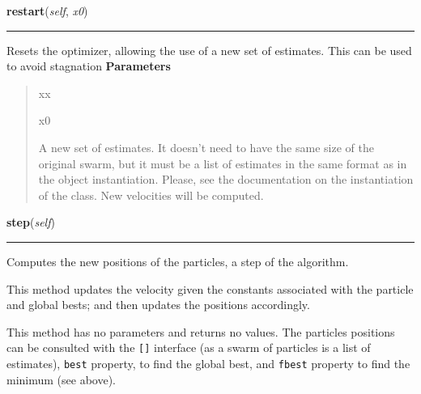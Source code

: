 \hspace{.8\funcindent}\begin{boxedminipage}{\funcwidth}

    \raggedright \textbf{restart}(\textit{self}, \textit{x0})

    \vspace{-1.5ex}

    \rule{\textwidth}{0.5\fboxrule}
\setlength{\parskip}{2ex}

Resets the optimizer, allowing the use of a new set of estimates. This
can be used to avoid stagnation
\setlength{\parskip}{1ex}
      \textbf{Parameters}
      \vspace{-1ex}

      \begin{quote}
        \begin{Ventry}{xx}

          \item[x0]


A new set of estimates. It doesn't need to have the same size of the
original swarm, but it must be a list of estimates in the same
format as in the object instantiation. Please, see the documentation
on the instantiation of the class. New velocities will be computed.
        \end{Ventry}

      \end{quote}

    \end{boxedminipage}

    \label{peach:pso:base:ParticleSwarmOptimizer:step}

    \vspace{0.5ex}

\hspace{.8\funcindent}\begin{boxedminipage}{\funcwidth}

    \raggedright \textbf{step}(\textit{self})

    \vspace{-1.5ex}

    \rule{\textwidth}{0.5\fboxrule}
\setlength{\parskip}{2ex}

Computes the new positions of the particles, a step of the algorithm.

This method updates the velocity given the constants associated with the
particle and global bests; and then updates the positions accordingly.

This method has no parameters and returns no values. The particles
positions can be consulted with the \texttt{{[}{]}} interface (as a swarm of
particles is a list of estimates), \texttt{best} property, to find the global
best, and \texttt{fbest} property to find the minimum (see above).
\setlength{\parskip}{1ex}
    \end{boxedminipage}

